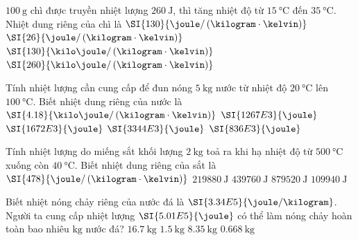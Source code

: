 \begin{ex}
	$\SI{100}{\gram}$ chì được truyền nhiệt lượng $\SI{260}{\joule}$, thì tăng nhiệt độ từ $\SI{15}{\celsius}$ đến $\SI{35}{\celsius}$. Nhiệt dung riêng của chì là
	\choice
	{\True $\SI{130}{\joule/\left(\kilogram\cdot\kelvin\right)}$}
	{$\SI{26}{\joule/\left(\kilogram\cdot\kelvin\right)}$}
	{$\SI{130}{\kilo\joule/\left(\kilogram\cdot\kelvin\right)}$}
	{$\SI{260}{\kilo\joule/\left(\kilogram\cdot\kelvin\right)}$}
\end{ex}
\begin{ex}
	Tính nhiệt lượng cần cung cấp để đun nóng $\SI{5}{\kilogram}$ nước từ nhiệt độ $\SI{20}{\celsius}$ lên $\SI{100}{\celsius}$. Biết nhiệt dung riêng của nước là $\SI{4.18}{\kilo\joule/\left(\kilogram\cdot\kelvin\right)}$
	\choice
	{$\SI{1267E3}{\joule}$}
	{\True $\SI{1672E3}{\joule}$}
	{$\SI{3344E3}{\joule}$}
	{$\SI{836E3}{\joule}$}
\end{ex}
\begin{ex}
	Tính nhiệt lượng do miếng sắt khối lượng $\SI{2}{\kilogram}$ toả ra khi hạ nhiệt độ từ $\SI{500}{\celsius}$ xuống còn $\SI{40}{\celsius}$. Biết nhiệt dung riêng của sắt là $\SI{478}{\joule/\left(\kilogram\cdot\kelvin\right)}$
	\choice
	{$\SI{219880}{\joule}$}
	{\True $\SI{439760}{\joule}$}
	{$\SI{879520}{\joule}$}
	{$\SI{109940}{\joule}$}
\end{ex}
\begin{ex}
	Biết nhiệt nóng chảy riêng của nước đá là $\SI{3.34E5}{\joule/\kilogram}$. Người ta cung cấp nhiệt lượng $\SI{5.01E5}{\joule}$ có thể làm nóng chảy hoàn toàn bao nhiêu $\si{\kilogram}$ nước đá?
	\choice
	{$\SI{16.7}{\kilogram}$}
	{\True $\SI{1.5}{\kilogram}$}
	{$\SI{8.35}{\kilogram}$}
	{$\SI{0.668}{\kilogram}$}
\end{ex}

